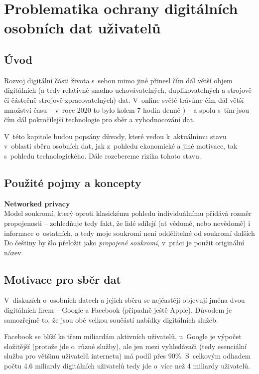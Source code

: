 \chapter{Problematika ochrany digitálních osobních dat uživatelů}

\section*{Úvod}
Rozvoj digitální části života s~sebou mimo jiné přinesl čím dál větší objem digitálních (a tedy relativně snadno uchovávatelných, duplikovatelných a strojově či částečně strojově zpracovatelných) dat. V~online světě trávíme čím dál větší množství času -- v~roce 2020 to bylo kolem 7 hodin denně \citep{digital-2021-report}) -- a spolu s~tím jsou čím dál pokročilejší technologie pro sběr a vyhodnocování dat.

V~této kapitole budou popsány důvody, které vedou k~aktuálnímu stavu v~oblasti sběru osobních dat, jak z~pohledu ekonomické a jiné motivace, tak s~pohledu technologického. Dále rozebereme rizika tohoto stavu.

\section{Použité pojmy a koncepty}

\textbf{Networked privacy}\\
Model soukromí, který oproti klasickému pohledu individuálnímu přidává rozměr propojenosti -- zohledňuje tedy fakt, že lidé sdílejí (ať vědomě, nebo nevědomě) i informace o~ostatních, a tedy moje soukromí není oddělitelné od soukromí dalších\citep{networked-privacy}\\
Do češtiny by šlo přeložit jako \textit{propojené soukromí}, v~práci je použit originální název.

\section{Motivace pro sběr dat}

V~diskuzích o~osobních datech a jejich sběru se nejčastěji objevují jména dvou digitálních firem -- Google a Facebook (případně ještě Apple). Důvodem je samozřejmě to, že jsou obě velkou součástí nabídky digitálních služeb.

Facebook se blíží ke třem miliardám aktivních uživatelů\citep{facebook-active-users}, u~Google je výpočet složitější (protože jde o~různé služby), ale jen mezi vyhledávači (tedy esenciální služba pro většinu uživatelů internetu) má podíl přes 90\%\citep{google-search}. S~celkovým odhadem počtu 4.6 miliardy digitálních uživatelů \citep{digital-2021-report} tedy jde o~více než 4 miliardy uživatelů.

